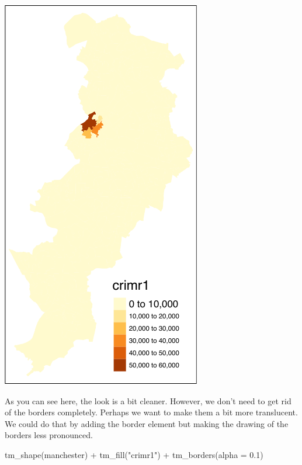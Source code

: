 \documentclass[
]{book}
\newenvironment{Shaded}{\begin{snugshade}}{\end{snugshade}}
\newcommand{\AttributeTok}[1]{\textcolor[rgb]{0.77,0.63,0.00}{#1}}
\newcommand{\FloatTok}[1]{\textcolor[rgb]{0.00,0.00,0.81}{#1}}
\newcommand{\FunctionTok}[1]{\textcolor[rgb]{0.00,0.00,0.00}{#1}}
\newcommand{\NormalTok}[1]{#1}
\newcommand{\SpecialCharTok}[1]{\textcolor[rgb]{0.00,0.00,0.00}{#1}}
\newcommand{\StringTok}[1]{\textcolor[rgb]{0.31,0.60,0.02}{#1}}
\begin{document}
\includegraphics{crime_mapping_files/figure-latex/unnamed-chunk-85-1.pdf}

As you can see here, the look is a bit cleaner. However, we don't need to get rid of the borders completely. Perhaps we want to make them a bit more translucent. We could do that by adding the border element but making the drawing of the borders less pronounced.

\begin{Shaded}
\begin{Highlighting}[]
\FunctionTok{tm\_shape}\NormalTok{(manchester) }\SpecialCharTok{+} 
  \FunctionTok{tm\_fill}\NormalTok{(}\StringTok{"crimr1"}\NormalTok{) }\SpecialCharTok{+}
  \FunctionTok{tm\_borders}\NormalTok{(}\AttributeTok{alpha =} \FloatTok{0.1}\NormalTok{)}
\end{Highlighting}
\end{Shaded}
\end{document}
